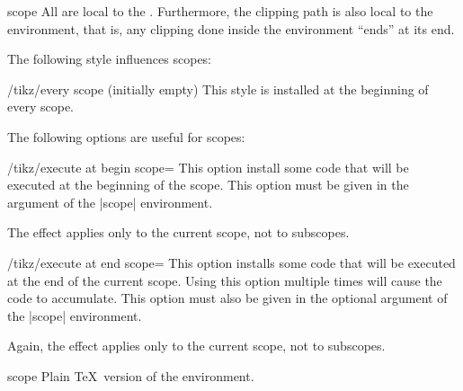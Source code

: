\begin{environment}{{scope}}
  All  are local to the . Furthermore, the clipping path is also local to the
  environment, that is, any clipping done inside the environment
  ``ends'' at its end.

\begin{codeexample}[]
\end{codeexample}
  
  The following style influences scopes:
  \begin{stylekey}{/tikz/every scope (initially \normalfont empty)}
    This style is installed at the beginning of every scope.
  \end{stylekey}

  The following options are useful for scopes:
  \begin{key}{/tikz/execute at begin scope=}
    This option install some code that will be executed
    at the beginning of the scope. This option must be
    given in the argument of the |{scope}| environment.

    The effect applies only to the current scope, not to subscopes.
  \end{key}
  \begin{key}{/tikz/execute at end scope=}
    This option installs some code that will be executed
    at the end of the  current scope. Using this option multiple times
    will  cause the code to accumulate. This option must also be given
    in the optional argument of the |{scope}| environment. 

    Again, the effect applies only to the current scope, not to subscopes.
  \end{key}
\end{environment}

\begin{plainenvironment}{{scope}}
  Plain \TeX\ version of the environment.
\end{plainenvironment}

